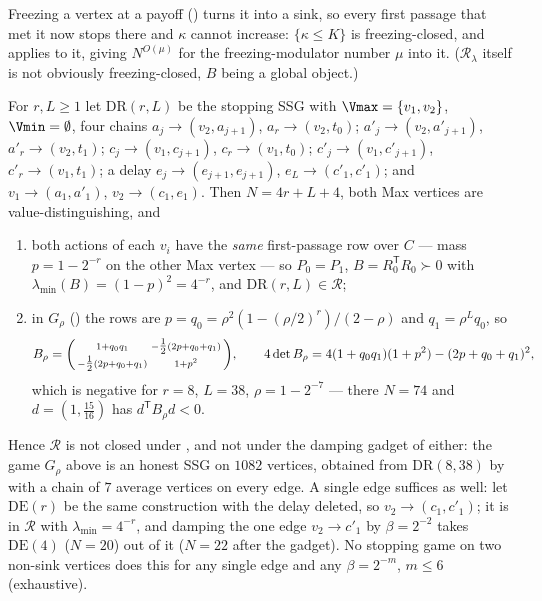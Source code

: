 \begin{remark}\label{ht:rem-freeze}
Freezing a vertex at a payoff () turns it into a sink, so every
first passage that met it now stops there and $\kappa$ cannot increase:
$\{\kappa\le K\}$ is freezing-closed, and  applies to it,
giving $N^{O(\mu)}$ for the freezing-modulator number $\mu$ into it.
($\mathcal R_\lambda$ itself is not obviously freezing-closed, $B$ being a
global object.)
\end{remark}

\begin{proposition}\label{ht:prop-damping}
For $r,L\ge1$ let $\mathrm{DR}(r,L)$ be the stopping SSG with
$\Vmax=\{v_1,v_2\}$, $\Vmin=\emptyset$, four chains
$a_j\to(v_2,a_{j+1})$, $a_r\to(v_2,t_0)$; $a'_j\to(v_2,a'_{j+1})$,
$a'_r\to(v_2,t_1)$; $c_j\to(v_1,c_{j+1})$, $c_r\to(v_1,t_0)$;
$c'_j\to(v_1,c'_{j+1})$, $c'_r\to(v_1,t_1)$; a delay
$e_j\to(e_{j+1},e_{j+1})$, $e_L\to(c'_1,c'_1)$; and
$v_1\to(a_1,a'_1)$, $v_2\to(c_1,e_1)$. Then $N=4r+L+4$, both Max vertices are
value-distinguishing, and
\begin{enumerate}[label=\textup{(\alph*)}]
\item both actions of each $v_i$ have the \emph{same} first-passage row over
$C$ --- mass $p=1-2^{-r}$ on the other Max vertex --- so $P_0=P_1$,
$B=R_0^{\mathsf T}R_0\succ0$ with $\lambda_{\min}(B)=(1-p)^2=4^{-r}$, and
$\mathrm{DR}(r,L)\in\mathcal R$;
\item in $G_\rho$ () the rows are
$p=q_0=\rho^2(1-(\rho/2)^r)/(2-\rho)$ and $q_1=\rho^{L}q_0$, so
\[
  B_\rho=\begin{psmallmatrix}1+q_0q_1&-\tfrac12(2p+q_0+q_1)\\
  -\tfrac12(2p+q_0+q_1)&1+p^{2}\end{psmallmatrix},\qquad
  4\det B_\rho=4(1+q_0q_1)(1+p^{2})-(2p+q_0+q_1)^{2},
\]
which is negative for $r=8$, $L=38$, $\rho=1-2^{-7}$ --- there $N=74$ and
$d=(1,\tfrac{15}{16})$ has $d^{\mathsf T}B_\rho d<0$.
\end{enumerate}
Hence $\mathcal R$ is not closed under , and not under
the damping gadget of  either: the game $G_\rho$ above is an
honest SSG on $1082$ vertices, obtained from $\mathrm{DR}(8,38)$ by
 with a chain of $7$ average vertices on every edge. A single
edge suffices as well: let $\mathrm{DE}(r)$ be the same construction with the
delay deleted, so $v_2\to(c_1,c'_1)$; it is in $\mathcal R$ with
$\lambda_{\min}=4^{-r}$, and damping the one edge $v_2\to c'_1$ by
$\beta=2^{-2}$ takes $\mathrm{DE}(4)$ ($N=20$) out of it ($N=22$ after the
gadget). No stopping game on two non-sink vertices does this for any single
edge and any $\beta=2^{-m}$, $m\le6$ (exhaustive).
\end{proposition}

